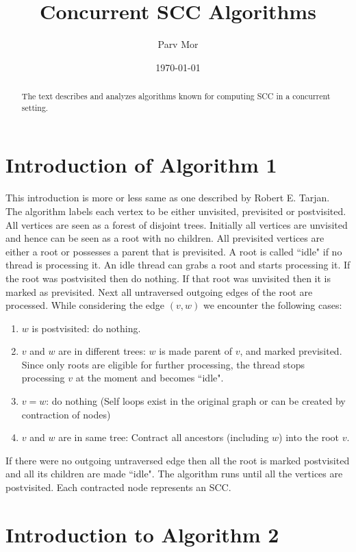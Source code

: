 \documentclass[a4paper]{article}
\title{Concurrent SCC Algorithms}
\author{Parv Mor}
\affil{Indian Institute of Technology, Kanpur}
\date{\today}
\begin{document}
\maketitle

\begin{abstract}
    The text describes and analyzes algorithms known for computing SCC in a concurrent setting. 
\end{abstract}

\section{Introduction of Algorithm 1}
\label{sec:intro1}

This introduction is more or less same as one described by Robert E. Tarjan. \\

The algorithm labels each vertex to be either unvisited, previsited or postvisited.
All vertices are seen as a forest of disjoint trees.
Initially all vertices are unvisited and hence can be seen as a root with no children.
All previsited vertices are either a root or possesses a parent that is previsited.
A root is called ``idle" if no thread is processing it.
An idle thread can grabs a root and starts processing it.
If the root was postvisited then do nothing.
If that root was unvisited then it is marked as previsited.
Next all untraversed outgoing edges of the root are processed.
While considering the edge $(v, w)$ we encounter the following cases:
\begin{enumerate}
    \item $w$ is postvisited: do nothing.
    \item $v$ and $w$ are in different trees: $w$ is made parent of $v$, and marked previsited. Since only roots are eligible for further processing, the thread stops processing $v$ at the moment and becomes ``idle".
    \item $v = w$: do nothing (Self loops exist in the original graph or can be created by contraction of nodes)
    \item $v$ and $w$ are in same tree: Contract all ancestors (including $w$) into the root $v$.
\end{enumerate}
If there were no outgoing untraversed edge then all the root is marked postvisited and all its children are made ``idle".
The algorithm runs until all the vertices are postvisited. Each contracted node represents an SCC.

\section{Introduction to Algorithm 2}
\label{sec:intro2}
\end{document}

